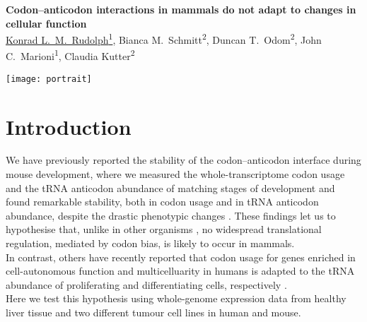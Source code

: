 \documentclass[a0,portrait]{a0poster}
\begin{document}
\sffamily
\Large

\noindent
\begin{minipage}[][10cm][t]{0.88\textwidth}
    {
        \VeryHuge\color{accent}\bfseries\sffamily%
        Codon–anticodon interactions in mammals do not adapt to changes in
        cellular function
    }
    {
        \\[\baselineskip]
        \noindent
        \Large\color{Black}%
        \underline{Konrad L.\ M.\ Rudolph\textsuperscript{1}},
        Bianca M.\ Schmitt\textsuperscript{2},
        Duncan T.\ Odom\textsuperscript{2},
        John C.\ Marioni\textsuperscript{1},
        Claudia Kutter\textsuperscript{2}
    }
\end{minipage}%
\hfill%
\begin{minipage}[][10cm][t]{0.1\textwidth}
    \raggedleft
    \texttt{[image: portrait]}
\end{minipage}

\vspace{-1cm}
\section*{Introduction}
{
\LARGE
We have previously reported the stability of the codon--anticodon interface
during mouse development, where we measured the whole-transcriptome codon
usage and the tRNA anticodon abundance of matching stages of development and
found remarkable stability, both in codon usage and in tRNA anticodon
abundance, despite the drastic phenotypic changes \citep{Schmitt:2014}.
These findings let us to hypothesise that, unlike in other organisms
\citep{Carlini:2003}, no widespread translational regulation, mediated by codon
bias, is likely to occur in mammals.\\
In contrast, others have recently reported that codon usage for genes
enriched in cell-autonomous function and multicelluarity in humans is
adapted to the tRNA abundance of proliferating and differentiating cells,
respectively \citep{Gingold:2014}.\\
Here we test this hypothesis using whole-genome expression data from healthy
liver tissue and two different tumour cell lines in human and mouse.
}

\vspace{-0.5cm}
\end{document}
